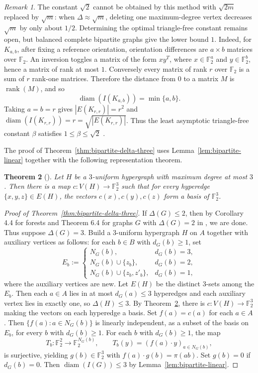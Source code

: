 \documentclass[11pt]{article}
\newtheorem{theorem}{Theorem}[section]
\theoremstyle{remark}
\newtheorem{remark}[theorem]{Remark}
\DeclareMathOperator{\diam}{diam}
\newcommand{\F}{\mathbb{F}}
\begin{document}
\begin{remark}\label{rem:triangle-free-constant}
The constant $\sqrt2$ cannot be obtained by this method with $\sqrt{2m}$ replaced by $\sqrt m$: when $\Delta\approx\sqrt m$, deleting one maximum-degree vertex decreases $\sqrt m$ by only about $1/2$.
Determining the optimal triangle-free constant remains open, but balanced complete bipartite graphs give the lower bound $1$.
Indeed, for $K_{a,b}$, after fixing a reference orientation, orientation differences are $a\times b$ matrices over $\F_2$.
An inversion toggles a matrix of the form $xy^T$, where $x\in\F_2^a$ and $y\in\F_2^b$, hence a matrix of rank at most $1$.
Conversely every matrix of rank $r$ over $\F_2$ is a sum of $r$ rank-one matrices.
Therefore the distance from $0$ to a matrix $M$ is $\operatorname{rank}(M)$, and so
\[
  \diam(I(K_{a,b}))=\min\{a,b\}.
\]
Taking $a=b=r$ gives $|E(K_{r,r})|=r^2$ and $\diam(I(K_{r,r}))=r=\sqrt{|E(K_{r,r})|}$.
Thus the least asymptotic triangle-free constant $\beta$ satisfies  $1\le\beta\le\sqrt2$ .
 
\end{remark}


The proof of Theorem~\ref{thm:bipartite-delta-three} uses Lemma~\ref{lem:bipartite-linear} together with the following representation theorem.

\begin{theorem}[\cite{FurediEtAl}] \label{thm:FGHK}
Let $H$ be a $3$-uniform hypergraph with maximum degree at most $3$.
Then there is a map $c:V(H)\to\F_2^3$ such that for every hyperedge
$\{x,y,z\}\in E(H)$, the vectors $c(x),c(y),c(z)$ form a basis of $\F_2^3$.
\end{theorem}

\begin{proof}[Proof of Theorem~\ref{thm:bipartite-delta-three}]
 If $\Delta(G)\le 2$, then by Corollary 4.4 for forests and Theorem 6.4 for graphs $G$ with $\Delta(G)= 2$ in \cite{HavetHorschRambaud}, we are done. Thus suppose $\Delta(G)=3$.
Build a $3$-uniform hypergraph $H$ on $A$ together with auxiliary vertices as follows: for each $b\in B$ with $d_G(b)\ge1$, set
\[
  E_b:=
  \begin{cases}
    N_G(b), & d_G(b)=3,\\
    N_G(b)\cup\{z_b\}, & d_G(b)=2,\\
    N_G(b)\cup\{z_b,z'_b\}, & d_G(b)=1,
  \end{cases}
\]
where the auxiliary vertices are new.
Let $E(H)$ be the distinct $3$-sets among the $E_b$.
Then each $a\in A$ lies in at most $d_G(a)\le3$ hyperedges and each auxiliary vertex lies in exactly one, so $\Delta(H)\le3$.
By Theorem~\ref{thm:FGHK}, there is $c:V(H)\to\F_2^3$ making the vectors on each hyperedge a basis. Set $f(a)=c(a)$ for each $a\in A$. 
Then $\{f(a):a\in N_G(b)\}$ is linearly independent, as a subset of the basis on $E_b$, for every $b$ with $d_G(b)\ge1$. For each $b$ with $d_G(b)\ge1$, the map
\[
  T_b:\F_2^2\to\F_2^{N_G(b)},\qquad
  T_b(y)=(f(a)\cdot y)_{a\in N_G(b)},
\]
is surjective, yielding $g(b)\in\F_2^3$ with $f(a)\cdot g(b)=\pi(ab)$. Set $g(b)=0$ if $d_G(b)=0$. Then $\diam(I(G))\le3$ by
Lemma~\ref{lem:bipartite-linear}.
\end{proof}
\end{document}
